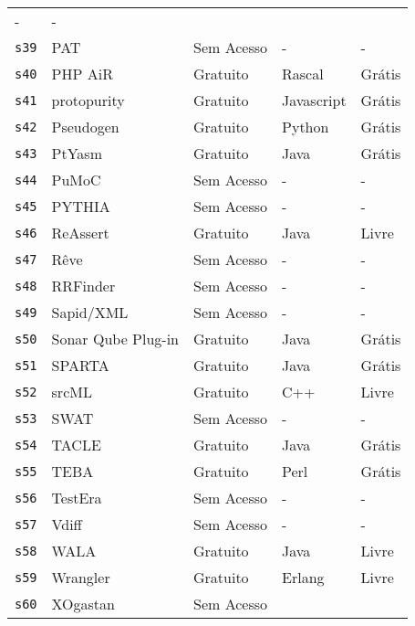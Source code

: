 \begin{longtable}{l l l p{3cm} l}
      - &
      - \\
    \texttt{s39} &
      PAT &
      Sem Acesso &
      - &
      - \\
    \texttt{s40} &
      PHP AiR &
      Gratuito &
      Rascal &
      Grátis \\
    \texttt{s41} &
      protopurity &
      Gratuito &
      Javascript &
      Grátis \\
    \texttt{s42} &
      Pseudogen &
      Gratuito &
      Python &
      Grátis \\
    \texttt{s43} &
      PtYasm &
      Gratuito &
      Java &
      Grátis \\
    \texttt{s44} &
      PuMoC &
      Sem Acesso &
      - &
      - \\
    \texttt{s45} &
      PYTHIA &
      Sem Acesso &
      - &
      - \\
    \texttt{s46} &
      ReAssert &
      Gratuito &
      Java &
      Livre \\
    \texttt{s47} &
      Rêve &
      Sem Acesso &
      - &
      - \\
    \texttt{s48} &
      RRFinder &
      Sem Acesso &
      - &
      - \\
    \texttt{s49} &
      Sapid/XML &
      Sem Acesso &
      - &
      - \\
    \texttt{s50} &
      Sonar Qube Plug-in &
      Gratuito &
      Java &
      Grátis \\
    \texttt{s51} &
      SPARTA &
      Gratuito &
      Java &
      Grátis \\
    \texttt{s52} &
      srcML &
      Gratuito &
      C++ &
      Livre \\
    \texttt{s53} &
      SWAT &
      Sem Acesso &
      - &
      - \\
    \texttt{s54} &
      TACLE &
      Gratuito &
      Java &
      Grátis \\
    \texttt{s55} &
      TEBA &
      Gratuito &
      Perl &
      Grátis \\
    \texttt{s56} &
      TestEra &
      Sem Acesso &
      - &
      - \\
    \texttt{s57} &
      Vdiff &
      Sem Acesso &
      - &
      - \\
    \texttt{s58} &
      WALA &
      Gratuito &
      Java &
      Livre \\
    \texttt{s59} &
      Wrangler &
      Gratuito &
      Erlang &
      Livre \\
    \texttt{s60} &
      XOgastan &
      Sem Acesso &

\end{longtable}
